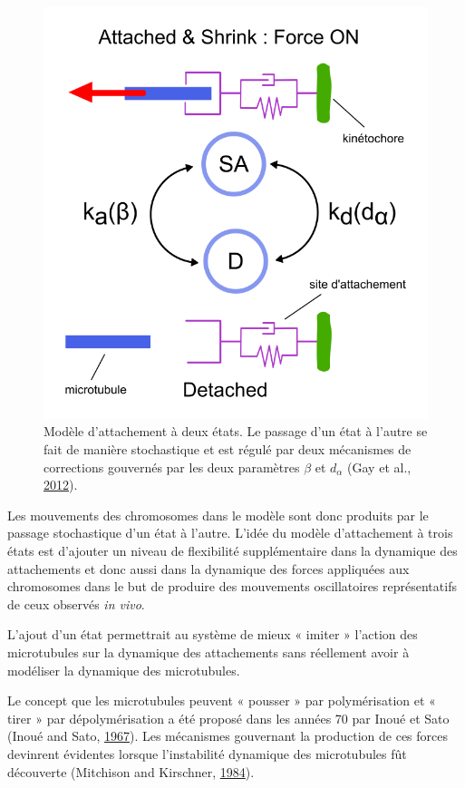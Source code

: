 \documentclass[12pt,a4paper,twoside,openright]{book}
\begin{document}
\begin{figure}[htbp]
\centering
\includegraphics{figures/results/modelling/two_states.png}
\caption[Modèle d'attachement à deux états]{\label{fig:two_states}Modèle
d'attachement à deux états. Le passage d'un état à l'autre se fait de
manière stochastique et est régulé par deux mécanismes de corrections
gouvernés par les deux paramètres \(\beta\) et \(d_\alpha\) (Gay et al.,
\hyperref[ref-Gay2012a]{2012}).}
\end{figure}

Les mouvements des chromosomes dans le modèle sont donc produits par le
passage stochastique d'un état à l'autre. L'idée du modèle d'attachement
à trois états est d'ajouter un niveau de flexibilité supplémentaire dans
la dynamique des attachements et donc aussi dans la dynamique des forces
appliquées aux chromosomes dans le but de produire des mouvements
oscillatoires représentatifs de ceux observés \emph{in vivo}.

L'ajout d'un état permettrait au système de mieux « imiter » l'action
des microtubules sur la dynamique des attachements sans réellement avoir
à modéliser la dynamique des microtubules.

Le concept que les microtubules peuvent « pousser » par polymérisation
et « tirer » par dépolymérisation a été proposé dans les années 70 par
Inoué et Sato (Inoué and Sato, \hyperref[ref-Inoue1967]{1967}). Les
mécanismes gouvernant la production de ces forces devinrent évidentes
lorsque l'instabilité dynamique des microtubules fût découverte
(Mitchison and Kirschner, \hyperref[ref-Mitchison1984]{1984}).
\end{document}
